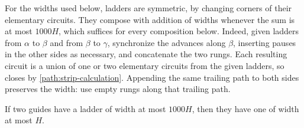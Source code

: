 For the widths used below, ladders are symmetric, by changing corners of
their elementary circuits.  They compose with addition of widths whenever
the sum is at most $1000H$, which suffices for every composition below.
Indeed, given ladders from
$\alpha$ to $\beta$ and from $\beta$ to $\gamma$, synchronize the advances
along $\beta$, inserting pauses in the other sides as necessary, and
concatenate the two rungs.  Each resulting circuit is a union of one or
two elementary circuits from the given ladders, so closes by
\eqref{path:strip-calculation}.  Appending the same trailing path to both
sides preserves the width: use empty rungs along that trailing path.

\begin{lemma}[Narrowing]\label{path:narrowing}
If two guides have a ladder of width at most $1000H$, then they have one
of width at most $H$.
\end{lemma}

